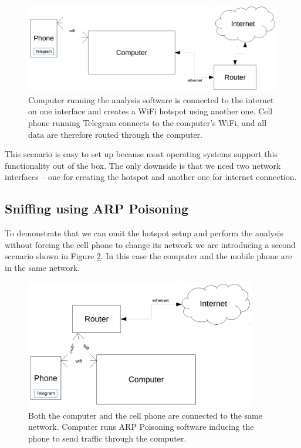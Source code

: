 \documentclass[thesis=M,english]{FITthesis}[2012/10/20]
\begin{document}
\begin{figure}[htb]
	\centering
	\includegraphics[width=1\textwidth]{setup-hotspot.pdf}
	\caption[Analysis setup 1]{Computer running the analysis software is connected to the internet on one interface and creates a WiFi hotspot using another one. Cell phone running Telegram connects to the computer's WiFi, and all data are therefore routed through the computer.}
	\label{img:analysis-setup-hotspot}
\end{figure}

This scenario is easy to set up because most operating systems support this functionality out of the box. The only downside is that we need two network interfaces -- one for creating the hotspot and another one for internet connection.


\subsection{Sniffing using ARP Poisoning}

To demonstrate that we can omit the hotspot setup and perform the analysis without forcing the cell phone to change its network we are introducing a second scenario shown in Figure \ref{img:analysis-setup-arp}. In this case the computer and the mobile phone are in the same network.

\begin{figure}[htb]
	\centering
	\includegraphics[width=0.9\textwidth]{setup-arp.pdf}
	\caption[Analysis setup 2]{Both the computer and the cell phone are connected to the same network. Computer runs ARP Poisoning software inducing the phone to send traffic through the computer.}
	\label{img:analysis-setup-arp}
\end{figure}
\end{document}

